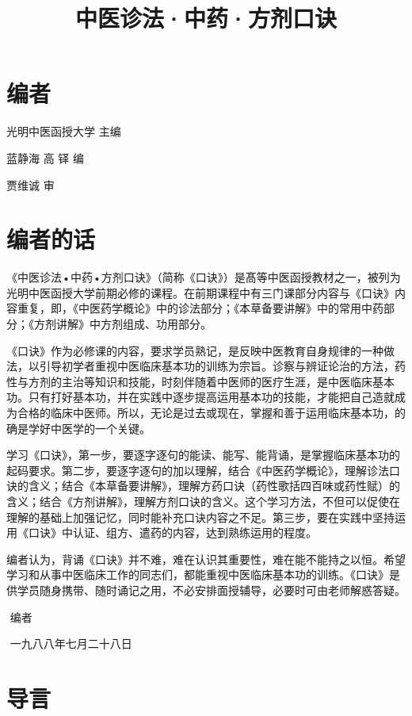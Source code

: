 \documentclass[a4paper,12pt,UTF8,twoside]{ctexbook}
\title{\heiti\zihao{0} 中医诊法·中药·方剂口诀}
\author{}
\date{}
\begin{document}
\maketitle
\tableofcontents

\frontmatter

\chapter{编者}

光明中医函授大学 主编

蓝静海 高 铎 编

贾维诚 审

\chapter{编者的话}

《中医诊法•中药•方剂口诀》（简称《口诀》）是髙等中医函授教材之一，被列为光明中医函授大学前期必修的课程。在前期课程中有三门课部分内容与《口诀》内容重复，即，《中医药学概论》中的诊法部分；《本草备要讲解》中的常用中药部分；《方剂讲解》中方剂组成、功用部分。

《口诀》作为必修课的内容，要求学员熟记，是反映中医教育自身规律的一种做法，以引导初学者重视中医临床基本功的训练为宗旨。诊察与辨证论治的方法，药性与方剂的主治等知识和技能，时刻伴随着中医师的医疗生涯，是中医临床基本功。只有打好基本功，并在实践中逐步提高运用基本功的技能，才能把自己造就成为合格的临床中医师。所以，无论是过去或现在，掌握和善于运用临床基本功，的确是学好中医学的一个关键。

学习《口诀》，第一步，要逐字逐句的能读、能写、能背诵，是掌握临床基本功的起码要求。第二步，要逐字逐句的加以理解，结合《中医药学概论》，理解诊法口诀的含义；结合《本草备要讲解》，理解方药口诀（药性歌括四百味或药性赋）的含义；结合《方剂讲解》，理解方剂口诀的含义。这个学习方法，不但可以促使在理解的基础上加强记忆，同时能补充口诀内容之不足。第三步，要在实践中坚持运用《口诀》中认证、组方、遣药的内容，达到熟练运用的程度。

编者认为，背诵《口诀》并不难，难在认识其重要性，难在能不能持之以恒。希望学习和从事中医临床工作的同志们，都能重视中医临床基本功的训练。《口诀》是供学员随身携带、随时诵记之用，不必安排面授辅导，必要时可由老师解惑答疑。

​ 编者

​ 一九八八年七月二十八日

\chapter{导言}
\end{document}
